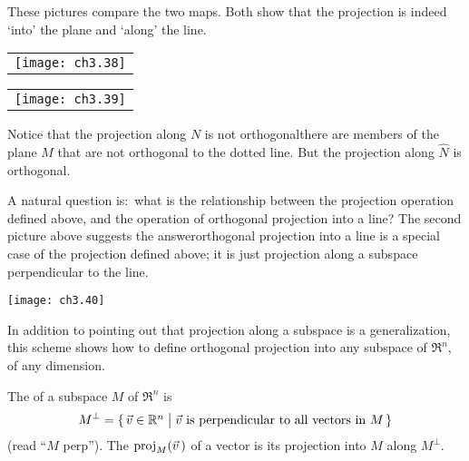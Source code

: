 \begin{example}
These pictures compare the two maps.
Both show that the projection is indeed `into' the plane and
`along' the line.
\begin{center}  \small
  \begin{tabular}{@{}c@{}}\texttt{[image: ch3.38]}\end{tabular}
  \qquad
  \begin{tabular}{@{}c@{}}\texttt{[image: ch3.39]}\end{tabular}
\end{center}
Notice that the projection along $N$ is not orthogonal\Dash there are
members of the plane $M$ that are not orthogonal to the dotted line.
But the projection along $\hat{N}$ is orthogonal. 
\end{example}

A natural question is:~what is the relationship between the projection 
operation defined above, and the operation of orthogonal projection
into a line? 
The second picture above suggests the answer\Dash orthogonal projection into
a line is a special case of the projection defined above; it is just 
projection along a subspace perpendicular to the line.
\begin{center}  \small
  \texttt{[image: ch3.40]}
\end{center}
In addition to pointing out that projection along a subspace is a 
generalization, this scheme shows how to define orthogonal projection into
any subspace of $\Re^n$, of any dimension. 

\begin{definition} \label{def:OrthComp}
The %
of a subspace \( M \) of $\Re^n$ is
\begin{equation*}
  M^\perp=\set{\vec{v}\in\Re^n\suchthat
                 \vec{v} \text{ is perpendicular to all vectors in }M}
\end{equation*}
(read ``\( M \) perp'').
The 
%
 \( \proj{\vec{v}\,}{M} \) 
of a vector is its projection into $M$ along \( M^\perp \).
\end{definition}


